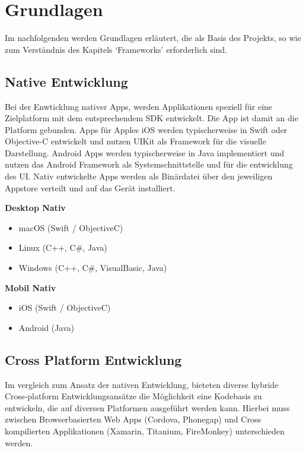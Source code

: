 
\chapter{Grundlagen}

Im nachfolgenden werden Grundlagen erläutert, die als Basis des Projekts, so wie zum Verständnis des Kapitels `Frameworks' erforderlich sind.


\section{Native Entwicklung}

Bei der Enwticklung nativer Apps, werden Applikationen speziell für eine Zielplatform mit dem entsprechendem \ac{SDK} entwickelt.
Die App ist damit an die Platform gebunden. Apps für Apples iOS werden typischerweise in Swift oder Objective-C entwickelt und nutzen UIKit als Framework für die visuelle Darstellung.
Android Apps werden typischerweise in Java implementiert und nutzen das Android Framework als Systemschnittstelle und für die entwicklung des \ac{UI}.
Nativ entwickelte Apps werden als Binärdatei über den jeweiligen Appstore verteilt und auf das Gerät installiert.\cite{Heitkoetter2013}

\vspace{1cm}
\textbf{Desktop Nativ}
\begin{itemize}
\item macOS (Swift / ObjectiveC)
\item Linux (C++, C\#, Java)
\item Windows (C++, C\#, VisualBasic, Java)
\end{itemize}

\textbf{Mobil Nativ}
\begin{itemize}
\item iOS (Swift / ObjectiveC)
\item Android (Java)
\end{itemize}

\vspace{1cm}


\section{Cross Platform Entwicklung}

Im vergleich zum Ansatz der nativen Entwicklung, bieteten diverse hybride Cross-platform Entwicklungsansätze die Möglichkeit eine Kodebasis zu entwickeln,
die auf diversen Platformen ausgeführt werden kann.\cite{Heitkoetter2013}
Hierbei muss zwischen Browserbasierten Web Apps (Cordova, Phonegap) und Cross kompilierten Applikationen (Xamarin, Titanium, FireMonkey) unterschieden werden.
\cite{Xamar84:online}

